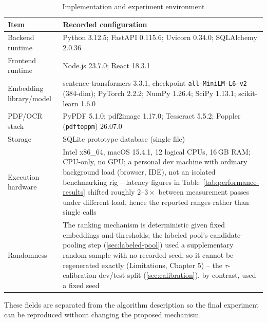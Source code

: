 \documentclass[12pt,a4paper,oneside]{report}
\begin{document}
\begin{table}[htbp]
\centering
\caption{Implementation and experiment environment}
\label{tab:environment}
\begin{tabularx}{\textwidth}{p{}X}
\toprule
Item & Recorded configuration \\
\midrule
Backend runtime & Python 3.12.5; FastAPI 0.115.6; Uvicorn 0.34.0; SQLAlchemy 2.0.36 \\
Frontend runtime & Node.js 23.7.0; React 18.3.1 \\
Embedding library/model & sentence-transformers 3.3.1, checkpoint \texttt{all-MiniLM-L6-v2} (384-dim); PyTorch 2.2.2; NumPy 1.26.4; SciPy 1.13.1; scikit-learn 1.6.0 \\
PDF/OCR stack & PyPDF 5.1.0; pdf2image 1.17.0; Tesseract 5.5.2; Poppler (\texttt{pdftoppm}) 26.07.0 \\
Storage & SQLite prototype database (single file) \\
Execution hardware & Intel x86\_64, macOS 15.4.1, 12 logical CPUs, 16\,GB RAM; CPU-only, no GPU; a personal dev machine with ordinary background load (browser, IDE), not an isolated benchmarking rig -- latency figures in Table~\ref{tab:performance-results} shifted roughly $2$--$3\times$ between measurement passes under different load, hence the reported ranges rather than single calls \\
Randomness & The ranking mechanism is deterministic given fixed embeddings and thresholds; the labeled pool's candidate-pooling step (\cref{sec:labeled-pool}) used a supplementary random sample with no recorded seed, so it cannot be regenerated exactly (Limitations, Chapter 5) -- the $\tau$-calibration dev/test split (\cref{sec:calibration}), by contrast, used a fixed seed \\
\bottomrule
\end{tabularx}
\end{table}

These fields are separated from the algorithm description so the final experiment can be reproduced without changing the proposed mechanism.
\end{document}
